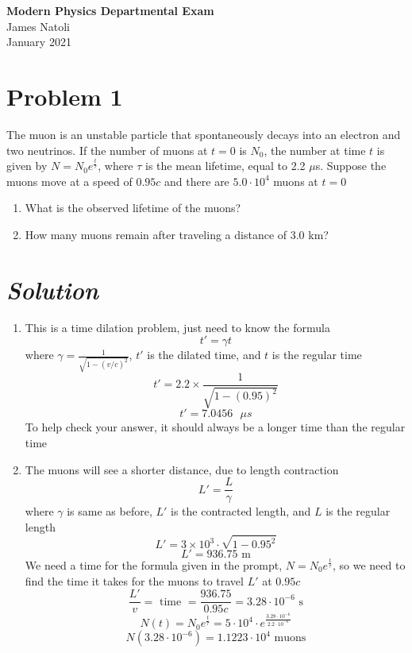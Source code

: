\documentclass{article}
\begin{document}
\thispagestyle{empty}
\begin{center}\Large \textbf{Modern Physics Departmental Exam} \\
\normalsize James Natoli \\  January 2021
\end{center}

\section*{Problem 1} 
The muon is an unstable particle that spontaneously decays into an electron and two neutrinos. If the number of muons at $t=0$ is $N_0$, the number at time $t$ is given by $N=N_0e^\frac{t}{\tau}$, where $\tau$ is the mean lifetime, equal to 2.2 $\mu$s. Suppose the muons move at a speed of $0.95c$ and there are $5.0 \cdot 10^4$ muons at $t=0$
\begin{enumerate}[label=\alph*)]
	\item %
	What is the observed lifetime of the muons?
	\item %
	How many muons remain after traveling a distance of 3.0 km?
\end{enumerate}
\section*{\textit{Solution}} 
\begin{enumerate}[label=\alph*)]
	\item %
	This is a time dilation problem, just need to know the formula
	$$ t' = \gamma t $$
	where $\gamma = \frac{1}{\sqrt{1 - (v/c)^2}}$, $t'$ is the dilated time, and $t$ is the regular time
	$$ t' = 2.2 \times \frac{1}{\sqrt{1 - (0.95)^2}}$$
	$$ t' = 7.0456 \text{ }\mu s$$
	To help check your answer, it should always be a longer time than the regular time
	\item %
	The muons will see a shorter distance, due to length contraction
	$$ L' = \frac{L}{\gamma} $$ 
	where $\gamma$ is same as before, $L'$ is the contracted length, and $L$ is the regular length
	$$ L' = 3\times 10^3 \cdot \sqrt{1 - 0.95^2} $$
	$$ L' = 936.75 \text{ m} $$
	We need a time for the formula given in the prompt, $N=N_0e^\frac{t}{\tau}$, so we need to find the time it takes for the muons to travel $L'$ at $0.95c$
	$$ \frac{L'}{v} = \text{ time } = \frac{936.75}{0.95c} = 3.28 \cdot 10^{-6} \text{ s}$$
	$$ N(t) = N_0e^\frac{t}{\tau} = 5\cdot 10^{4} \cdot e^\frac{3.28 \cdot 10^{-6}}{2.2\cdot10^{-6}} $$
	$$ N(3.28 \cdot 10^{-6}) = 1.1223 \cdot 10^4 \text{ muons}$$

\end{enumerate}
\end{document}
